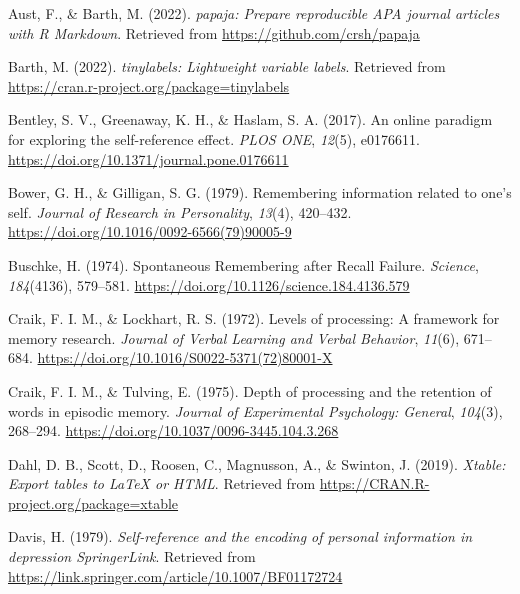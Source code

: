 \documentclass[
  man,floatsintext]{apa6}
\newlength{\cslhangindent}
\newlength{\cslentryspacingunit} %
\newenvironment{CSLReferences}[2] %
 {%
  \setlength{\parindent}{0pt}
  \ifodd #1
  \let\oldpar\par
  \def\par{\hangindent=\cslhangindent\oldpar}
  \fi
  \setlength{\parskip}{#2\cslentryspacingunit}
 }%
 {}
\begin{document}
\hypertarget{refs}{}
\begin{CSLReferences}{1}{0}
\leavevmode{}%
Aust, F., \& Barth, M. (2022). \emph{{papaja}: {Prepare} reproducible {APA} journal articles with {R Markdown}}. Retrieved from \url{https://github.com/crsh/papaja}

\leavevmode{}%
Barth, M. (2022). \emph{{tinylabels}: Lightweight variable labels}. Retrieved from \url{https://cran.r-project.org/package=tinylabels}

\leavevmode{}%
Bentley, S. V., Greenaway, K. H., \& Haslam, S. A. (2017). An online paradigm for exploring the self-reference effect. \emph{PLOS ONE}, \emph{12}(5), e0176611. \url{https://doi.org/10.1371/journal.pone.0176611}

\leavevmode{}%
Bower, G. H., \& Gilligan, S. G. (1979). Remembering information related to one's self. \emph{Journal of Research in Personality}, \emph{13}(4), 420--432. \url{https://doi.org/10.1016/0092-6566(79)90005-9}

\leavevmode{}%
Buschke, H. (1974). Spontaneous {Remembering} after {Recall} {Failure}. \emph{Science}, \emph{184}(4136), 579--581. \url{https://doi.org/10.1126/science.184.4136.579}

\leavevmode{}%
Craik, F. I. M., \& Lockhart, R. S. (1972). Levels of processing: {A} framework for memory research. \emph{Journal of Verbal Learning and Verbal Behavior}, \emph{11}(6), 671--684. \url{https://doi.org/10.1016/S0022-5371(72)80001-X}

\leavevmode{}%
Craik, F. I. M., \& Tulving, E. (1975). Depth of processing and the retention of words in episodic memory. \emph{Journal of Experimental Psychology: General}, \emph{104}(3), 268--294. \url{https://doi.org/10.1037/0096-3445.104.3.268}

\leavevmode{}%
Dahl, D. B., Scott, D., Roosen, C., Magnusson, A., \& Swinton, J. (2019). \emph{Xtable: Export tables to LaTeX or HTML}. Retrieved from \url{https://CRAN.R-project.org/package=xtable}

\leavevmode{}%
Davis, H. (1979). \emph{Self-reference and the encoding of personal information in depression {\textbar} {SpringerLink}}. Retrieved from \url{https://link.springer.com/article/10.1007/BF01172724}


\end{CSLReferences}
\end{document}
